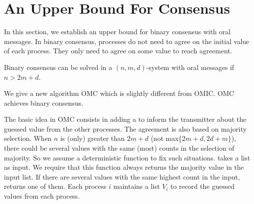 \section{An Upper Bound For Consensus}\label{sec:consensus}

In this section, we establish an upper bound for binary consensus with oral messages. 
In binary consensus, processes do not need to agree on the initial value of each process. 
They only need to  agree on some value to reach agreement.

\begin{theorem} \label{thmConsensus}
Binary consensus can be solved in a  $(n,m,d)$-system with oral messages if  $n>2m+d$.
\end{theorem}

We give a new algorithm OMC which is slightly different from OMIC. OMC achieves binary consensus.


The basic idea in OMC consists in adding a  to inform the transmitter about the guessed value from the other processes. 
The agreement is also based on majority selection. 
When $n$ is (only) greater than $2m+d$ (not max$\{2m+d,2d+m\}$), there could be several values 
with the same (most) counts in the selection of majority.
So we assume a deterministic function  to fix such situations. 
 takes a list as input. 
We require that this function  always returns the majority value in the input list. 
If there are several values with the same highest count in the input,   returns one of them. 
Each process $i$ maintains a list $V_i$ to record the
guessed values from each process.



